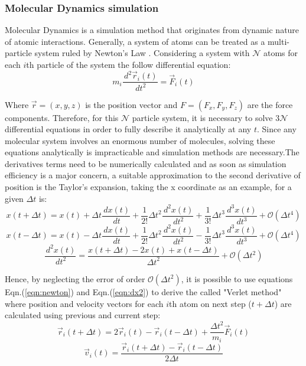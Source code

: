 \documentclass[10pt,a4paper,twoside]{article}
\begin{document}
\subsubsection*{Molecular Dynamics simulation}

Molecular Dynamics is a simulation method that originates from dynamic nature of atomic interactions. Generally, a system of atoms can be treated as a multi-particle system ruled by Newton's Law \cite{umd}. Considering a system with $\mathcal{N}$ atoms for each $i$th particle of the system the follow differential equation:
\begin{equation}
m_i\dfrac{\,d^2\vec{r}_i(t)}{\,dt^2} = \vec{F}_i(t)
\label{eqn:newton}
\end{equation}

Where $\vec{r} = (x,y,z)$ is the position vector and $F = (F_x, F_y, F_z)$ are the force components. Therefore, for this $\mathcal{N}$ particle system, it is necessary to solve $3\mathcal{N}$ differential equations in order to fully describe it analytically at any $t$. Since any molecular system involves an enormous number of molecules, solving these equations analytically is impracticable and simulation methods are necessary.The derivatives terms need to be numerically calculated and as soon as simulation efficiency is a major concern, a suitable approximation to the second derivative of position is the Taylor's expansion, taking the x coordinate as an example, for a given $\Delta t$ is:
\begin{equation}
x(t+\Delta t) = x(t) + \Delta t \dfrac{\,dx(t)}{\,dt} + \dfrac{1}{2!}{\Delta t}^2 \dfrac{\,d^2x(t)}{\,dt^2} + \dfrac{1}{3!}{\Delta t}^3 \dfrac{\,d^3x(t)}{\,dt^3} +  \mathcal{O}(\Delta t^4)
\label{eqn:taylor1}
\end{equation}
\begin{equation}
x(t-\Delta t) = x(t) - \Delta t \dfrac{\,dx(t)}{\,dt} + \dfrac{1}{2!}{\Delta t}^2 \dfrac{\,d^2x(t)}{\,dt^2} - \dfrac{1}{3!}{\Delta t}^3 \dfrac{\,d^3x(t)}{\,dt^3} +  \mathcal{O}(\Delta t^4)
\label{eqn:taylor2}
\end{equation}
\begin{equation}
\dfrac{\,d^2x(t)}{\,dt^2} = \dfrac{x(t+\Delta t) - 2 x(t) + x(t-\Delta t)}{{\Delta t}^2} +  \mathcal{O}(\Delta t^2)
\label{eqn:dx2}
\end{equation}

Hence, by neglecting the error of order $\mathcal{O}(\Delta t^2)$, it is possible to use equations Eqn.(\ref{eqn:newton}) and Eqn.(\ref{eqn:dx2}) to derive the called "Verlet method" where position and velocity vectors for each $i$th atom on next step ($t+\Delta t$) are calculated using previous and current step:
\begin{equation}
\vec{r}_i(t+\Delta t) = 2 \vec{r}_i(t) - \vec{r}_i(t-\Delta t) + \dfrac{{\Delta t}^2}{m_i}\vec{F}_i(t)
\label{eqn:verletr}
\end{equation}
\begin{equation}
\vec{v}_i(t) =  \dfrac{\vec{r}_i(t+\Delta t) - \vec{r}_i(t-\Delta t)}{2{\Delta t}}
\label{eqn:verletv}
\end{equation}
\end{document}
